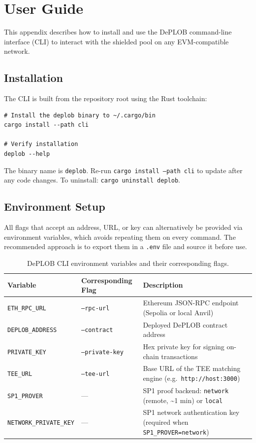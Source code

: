 \documentclass[12pt,a4paper]{article}
\begin{document}
\section{User Guide}
\label{app:userguide}

This appendix describes how to install and use the DePLOB command-line interface (CLI) to interact with the shielded pool on any EVM-compatible network.

\subsection{Installation}

The CLI is built from the repository root using the Rust toolchain:

\begin{verbatim}
# Install the deplob binary to ~/.cargo/bin
cargo install --path cli

# Verify installation
deplob --help
\end{verbatim}

\noindent The binary name is \texttt{deplob}. Re-run \texttt{cargo install --path cli} to update after any code changes. To uninstall: \texttt{cargo uninstall deplob}.

\subsection{Environment Setup}

All flags that accept an address, URL, or key can alternatively be provided via environment variables, which avoids repeating them on every command. The recommended approach is to export them in a \texttt{.env} file and source it before use.

\begin{table}[H]
\centering
\small
\begin{tabular}{|l|l|p{5.5cm}|}
\hline
\textbf{Variable} & \textbf{Corresponding Flag} & \textbf{Description} \\
\hline
\texttt{ETH\_RPC\_URL} & \texttt{--rpc-url} & Ethereum JSON-RPC endpoint (Sepolia or local Anvil) \\
\hline
\texttt{DEPLOB\_ADDRESS} & \texttt{--contract} & Deployed DePLOB contract address \\
\hline
\texttt{PRIVATE\_KEY} & \texttt{--private-key} & Hex private key for signing on-chain transactions \\
\hline
\texttt{TEE\_URL} & \texttt{--tee-url} & Base URL of the TEE matching engine (e.g.\ \texttt{http://host:3000}) \\
\hline
\texttt{SP1\_PROVER} & — & SP1 proof backend: \texttt{network} (remote, \textasciitilde{}1 min) or \texttt{local} \\
\hline
\texttt{NETWORK\_PRIVATE\_KEY} & — & SP1 network authentication key (required when \texttt{SP1\_PROVER=network}) \\
\hline
\end{tabular}
\caption{DePLOB CLI environment variables and their corresponding flags.}
\label{tab:env_vars}
\end{table}
\end{document}

